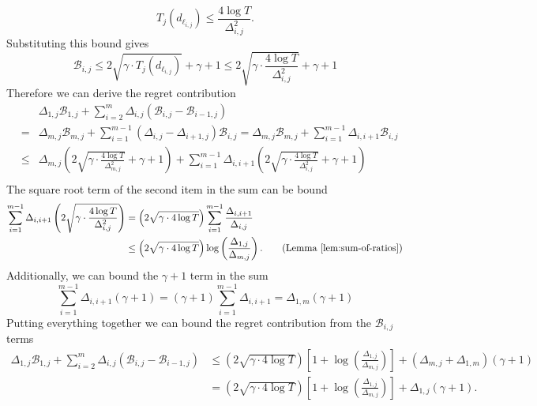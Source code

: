 \documentclass[opre,blindrev]{informs3}
\begin{document}
\begin{APPENDICES}
    \[
        T_j(d_{\ell_{i,j}}) \leq \frac{4 \log T}{\Delta_{i,j}^2}.
    \]
    Substituting this bound gives
  $$  \mathcal{B}_{i,j}\leq 2\sqrt{\gamma \cdot T_j(d_{\ell_{i,j}})} + \gamma + 1
        \leq 2\sqrt{\gamma \cdot \frac{4\log T}{\Delta_{i,j}^2}} + \gamma + 1 $$
    Therefore we can derive the regret contribution
    \begin{eqnarray*}
       && \Delta_{1,j}\mathcal{B}_{1,j}+ \sum_{i=2}^m \Delta_{i,j}\left(\mathcal{B}_{i,j} -  \mathcal{B}_{i-1,j}\right)\\
       &=&\Delta_{m,j}\mathcal{B}_{m,j}+ \sum_{i=1}^{m-1} \left(\Delta_{i,j}-\Delta_{i+1,j}\right)\mathcal{B}_{i,j}
        =\Delta_{m,j}\mathcal{B}_{m,j}+ \sum_{i=1}^{m-1} \Delta_{i,i+1}\mathcal{B}_{i,j}\\
        &\leq& \Delta_{m,j}\left(2\sqrt{\gamma \cdot \frac{4\log T}{\Delta_{m,j}^2}} + \gamma + 1\right)+ \sum_{i=1}^{m-1} \Delta_{i,i+1}\left(2\sqrt{\gamma \cdot \frac{4\log T}{\Delta_{i,j}^2}} + \gamma + 1\right)\\
    \end{eqnarray*}
    The square root term of the second item in the sum can be bound
    \begin{align*}
        \sum_{i=1}^{m-1} \Delta_{i,i+1}\left(2\sqrt{\gamma \cdot \frac{4\log T}{\Delta_{i,j}^2}}\right)
        &= \left(2\sqrt{\gamma \cdot 4\log T}\right)\sum_{i=1}^{m-1} \frac{\Delta_{i,i+1}}{\Delta_{i,j}}\\
        &\leq\left(2\sqrt{\gamma \cdot 4\log T}\right)\log\left(\frac{\Delta_{1,j}}{\Delta_{m,j}}\right). \tag{Lemma \ref{lem:sum-of-ratios}}
    \end{align*}
    Additionally, we can bound the \(\gamma + 1\) term in the sum
    \[\sum_{i=1}^{m-1} \Delta_{i,i+1}(\gamma + 1)=(\gamma+1)\sum_{i=1}^{m-1} \Delta_{i,i+1}=\Delta_{1,m}(\gamma+1)\]
    Putting everything together we can bound the regret contribution from the \(\mathcal{B}_{i,j}\) terms
    \begin{align*}
        \Delta_{1,j}\mathcal{B}_{1,j}+ \sum_{i=2}^m \Delta_{i,j}\left(\mathcal{B}_{i,j} -  \mathcal{B}_{i-1,j}\right)&\leq \left(2\sqrt{\gamma \cdot 4\log T}\right)\left[1+\log\left(\frac{\Delta_{1,j}}{\Delta_{m,j}}\right)\right] +(\Delta_{m,j}+\Delta_{1,m})(\gamma + 1)\\
        &= \left(2\sqrt{\gamma \cdot 4\log T}\right)\left[1+\log\left(\frac{\Delta_{1,j}}{\Delta_{m,j}}\right)\right] + \Delta_{1,j}(\gamma + 1).
    \end{align*}
    

\end{APPENDICES}
\end{document}
